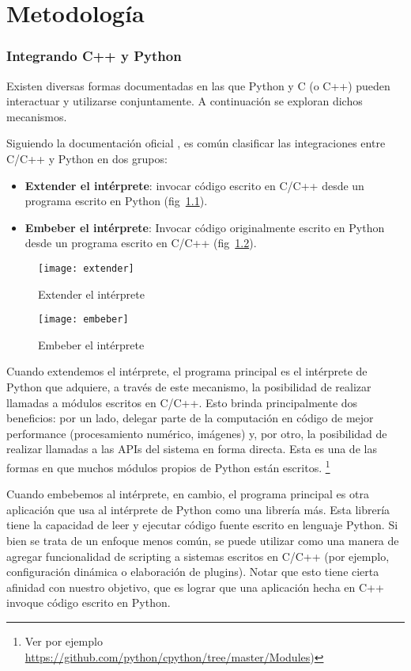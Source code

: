 \chapter{Metodología}\label{sec:met}

\subsection{Integrando C++ y Python}

Existen diversas formas documentadas en las que Python y C (o C++) pueden
interactuar y utilizarse conjuntamente. A continuación se exploran dichos
mecanismos.

Siguiendo la documentación oficial \cite{extending}, es común clasificar las
integraciones entre C/C++ y Python en dos grupos:

\begin{itemize}
    \item \textbf{Extender el intérprete}: invocar código escrito en C/C++
    desde un programa escrito en Python (fig~\ref{fig:extender}).

    \item \textbf{Embeber el intérprete}: Invocar código originalmente escrito
    en Python desde un programa escrito en C/C++ (fig~\ref{fig:embeber}).
\end{itemize}

\begin{figure}[h]
\caption{Extender el intérprete}
\label{fig:extender}
\centering
\texttt{[image: extender]}
\end{figure}

\begin{figure}[h]
\caption{Embeber el intérprete}
\label{fig:embeber}
\centering
\texttt{[image: embeber]}
\end{figure}

Cuando extendemos el intérprete, el programa principal es el intérprete de
Python que adquiere, a través de este mecanismo, la posibilidad de realizar
llamadas a módulos escritos en C/C++. Esto brinda principalmente dos
beneficios: por un lado, delegar parte de la computación en código de mejor
performance (procesamiento numérico, imágenes) y, por otro, la posibilidad de
realizar llamadas a las APIs del sistema en forma directa. Esta es una de las
formas en que muchos módulos propios de Python están escritos. \footnote{Ver por ejemplo
\url{https://github.com/python/cpython/tree/master/Modules})}

Cuando embebemos al intérprete, en cambio, el programa principal es otra
aplicación que usa al intérprete de Python como una librería más. Esta librería
tiene la capacidad de leer y ejecutar código fuente escrito en lenguaje Python.
Si bien se trata de un enfoque menos común, se puede utilizar como una manera
de agregar funcionalidad de scripting a sistemas escritos en C/C++ (por
ejemplo, configuración dinámica o elaboración de plugins). Notar que esto tiene
cierta afinidad con nuestro objetivo, que es lograr que una aplicación hecha en
C++ invoque código escrito en Python.

